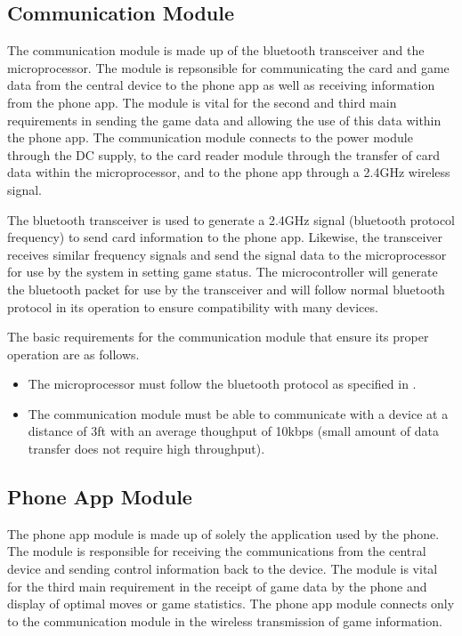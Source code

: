 \documentclass[12pt]{article}
\begin{document}
\subsection{Communication Module}

The communication module is made up of the bluetooth transceiver and the microprocessor. The module is repsonsible for communicating the card and game data from the central device to the phone app as well as receiving information from the phone app. The module is vital for the second and third main requirements in sending the game data and allowing the use of this data within the phone app. The communication module connects to the power module through the DC supply, to the card reader module through the transfer of card data within the microprocessor, and to the phone app through a 2.4GHz wireless signal.

The bluetooth transceiver is used to generate a 2.4GHz signal (bluetooth protocol frequency) to send card information to the phone app. Likewise, the transceiver receives similar frequency signals and send the signal data to the microprocessor for use by the system in setting game status. The microcontroller will generate the bluetooth packet for use by the transceiver and will follow normal bluetooth protocol in its operation to ensure compatibility with many devices.

The basic requirements for the communication module that ensure its proper operation are as follows.

\begin{itemize}
\item The microprocessor must follow the bluetooth protocol as specified in \cite{IEEE_bt}.
\item The communication module must be able to communicate with a device at a distance of 3ft with an average thoughput of 10kbps (small amount of data transfer does not require high throughput).
\end{itemize}

\subsection{Phone App Module}

The phone app module is made up of solely the application used by the phone. The module is responsible for receiving the communications from the central device and sending control information back to the device. The module is vital for the third main requirement in the receipt of game data by the phone and display of optimal moves or game statistics. The phone app module connects only to the communication module in the wireless transmission of game information.
\end{document}
